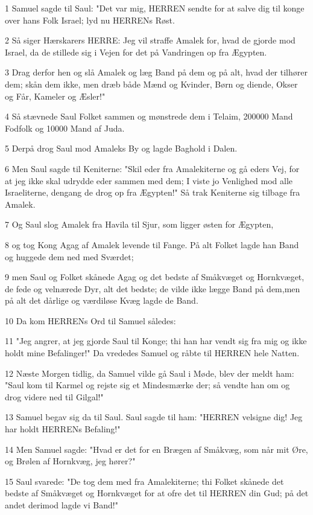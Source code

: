 \par 1 Samuel sagde til Saul: "Det var mig, HERREN sendte for at salve dig til konge over hans Folk Israel; lyd nu HERRENs Røst.
\par 2 Så siger Hærskarers HERRE: Jeg vil straffe Amalek for, hvad de gjorde mod Israel, da de stillede sig i Vejen for det på Vandringen op fra Ægypten.
\par 3 Drag derfor hen og slå Amalek og læg Band på dem og på alt, hvad der tilhører dem; skån dem ikke, men dræb både Mænd og Kvinder, Børn og diende, Okser og Får, Kameler og Æsler!"
\par 4 Så stævnede Saul Folket sammen og mønstrede dem i Telaim, 200000 Mand Fodfolk og 10000 Mand af Juda.
\par 5 Derpå drog Saul mod Amaleks By og lagde Baghold i Dalen.
\par 6 Men Saul sagde til Keniterne: "Skil eder fra Amalekiterne og gå eders Vej, for at jeg ikke skal udrydde eder sammen med dem; I viste jo Venlighed mod alle Israeliterne, dengang de drog op fra Ægypten!" Så trak Keniterne sig tilbage fra Amalek.
\par 7 Og Saul slog Amalek fra Havila til Sjur, som ligger østen for Ægypten,
\par 8 og tog Kong Agag af Amalek levende til Fange. På alt Folket lagde han Band og huggede dem ned med Sværdet;
\par 9 men Saul og Folket skånede Agag og det bedste af Småkvæget og Hornkvæget, de fede og velnærede Dyr, alt det bedste; de vilde ikke lægge Band på dem,men på alt det dårlige og værdiløse Kvæg lagde de Band.
\par 10 Da kom HERRENs Ord til Samuel således:
\par 11 "Jeg angrer, at jeg gjorde Saul til Konge; thi han har vendt sig fra mig og ikke holdt mine Befalinger!" Da vrededes Samuel og råbte til HERREN hele Natten.
\par 12 Næste Morgen tidlig, da Samuel vilde gå Saul i Møde, blev der meldt ham: "Saul kom til Karmel og rejste sig et Mindesmærke der; så vendte han om og drog videre ned til Gilgal!"
\par 13 Samuel begav sig da til Saul. Saul sagde til ham: "HERREN velsigne dig! Jeg har holdt HERRENs Befaling!"
\par 14 Men Samuel sagde: "Hvad er det for en Brægen af Småkvæg, som når mit Øre, og Brølen af Hornkvæg, jeg hører?"
\par 15 Saul svarede: "De tog dem med fra Amalekiterne; thi Folket skånede det bedste af Småkvæget og Hornkvæget for at ofre det til HERREN din Gud; på det andet derimod lagde vi Band!"
